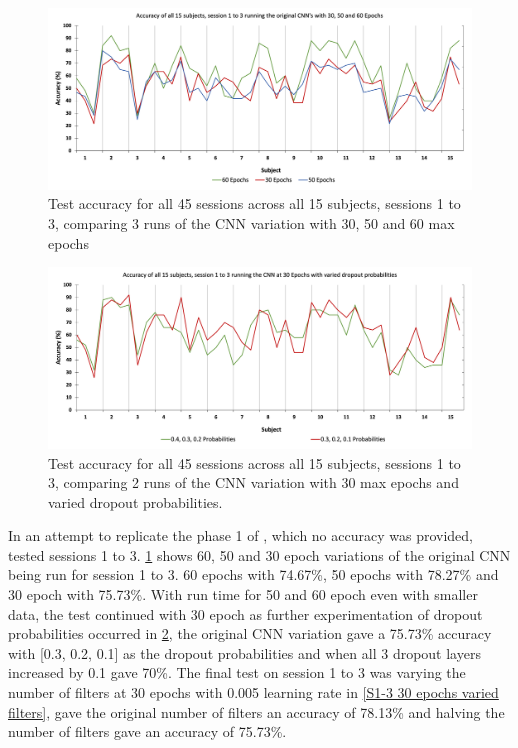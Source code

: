 \begin{figure}[H]
\centering
\includegraphics[scale=0.5]{Media/SBJ1-15_S1-3/SBJ1-15&S1-3_30&50_Epochs_Accuracy.png}
\caption{Test accuracy for all 45 sessions across all 15 subjects, sessions 1 to 3, comparing 3 runs of the CNN variation with 30, 50 and 60 max epochs}
\label{S1-3 30 50 epochs}
\end{figure}

\begin{figure}[H]
\centering
\includegraphics[scale=0.5]{Media/SBJ1-15_S1-3/SBJ1-15&S1-3_30_Epochs_Varied_Dropout_Accuracy.png}
\caption{Test accuracy for all 45 sessions across all 15 subjects, sessions 1 to 3, comparing 2 runs of the CNN variation with 30 max epochs and varied dropout probabilities.}
\label{S1-3 30 epochs varied dr}
\end{figure}

In an attempt to replicate the phase 1 of \cite{DatasetPaper}, which no accuracy was provided, tested sessions 1 to 3. \cref{S1-3 30 50 epochs} shows 60, 50 and 30 epoch variations of the original CNN being run for session 1 to 3. 60 epochs with 74.67\%, 50 epochs with 78.27\% and 30 epoch with 75.73\%. With run time for 50 and 60 epoch even with smaller data, the test continued with 30 epoch as further experimentation of dropout probabilities occurred in \cref{S1-3 30 epochs varied dr}, the original CNN variation gave a 75.73\% accuracy with [0.3, 0.2, 0.1] as the dropout probabilities and when all 3 dropout layers increased by 0.1 gave 70\%. The final test on session 1 to 3 was varying the number of filters at 30 epochs with 0.005 learning rate in \cref{S1-3 30 epochs varied filters}, gave the original number of filters an accuracy of 78.13\% and halving the number of filters gave an accuracy of 75.73\%.


